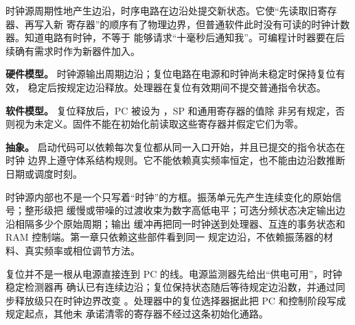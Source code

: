 时钟源周期性地产生边沿，时序电路在边沿处提交新状态。它使“先读取旧寄存器、再写入新
寄存器”的顺序有了物理边界，但普通软件此时没有可读的时钟计数器。知道电路有时钟，不等于
能够请求“十毫秒后通知我”。可编程计时器要在后续确有需求时作为新器件加入。

\textbf{硬件模型。} 时钟源输出周期边沿；复位电路在电源和时钟尚未稳定时保持复位有效，
稳定后按规定边沿释放。处理器在复位有效期间不提交普通指令状态。

\textbf{软件模型。} 复位释放后，PC 被设为 ，SP 和通用寄存器的值除
非另有规定，否则视为未定义。固件不能在初始化前读取这些寄存器并假定它们为零。

\textbf{抽象。} 启动代码可以依赖每次复位都从同一入口开始，并且已提交的指令状态在时钟
边界上遵守体系结构规则。它不能依赖真实频率恒定，也不能由边沿数推断日期或调度时刻。

时钟源内部也不是一个只写着“时钟”的方框。振荡单元先产生连续变化的原始信号；整形级把
缓慢或带噪的过渡收束为数字高低电平；可选分频状态决定输出边沿相隔多少个原始周期；输出
缓冲再把同一时钟送到处理器、互连的事务状态和 RAM 控制端。第一章只依赖这些部件看到同一
规定边沿，不依赖振荡器的材料、真实频率或相位调节方法。

\begin{center}
\end{center}

复位并不是一根从电源直接连到 PC 的线。电源监测器先给出“供电可用”，时钟稳定检测器再
确认已有连续边沿；复位保持状态随后等待规定边沿数，并通过同步释放级只在时钟边界改变
。处理器中的复位选择器据此把 PC 和控制阶段写成规定起点，其他未
承诺清零的寄存器不经过这条初始化通路。


